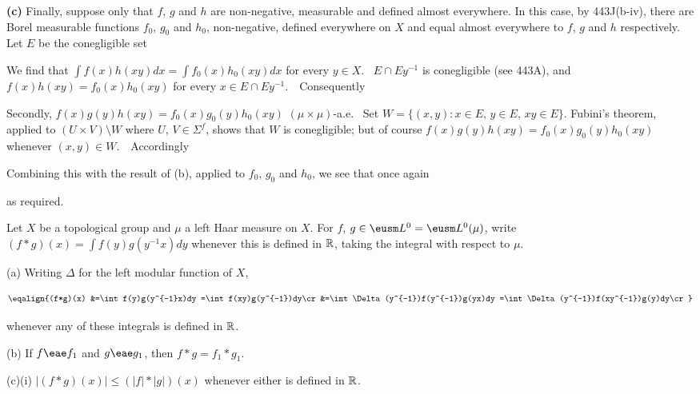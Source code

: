 {\medskip

{\bf (c)} Finally, suppose only that $f$, $g$ and $h$ are non-negative,
measurable and defined almost everywhere.   In this case, by 443J(b-iv),
there are Borel measurable functions $f_0$, $g_0$ and $h_0$,
non-negative, defined everywhere on $X$ and equal almost everywhere to
$f$, $g$ and $h$ respectively.   Let $E$ be the conegligible set


We find that $\int f(x)h(xy)dx=\int f_0(x)h_0(xy)dx$ for every $y\in X$.
\Prf\ $E\cap Ey^{-1}$ is conegligible (see 443A), and
$f(x)h(xy)=f_0(x)h_0(xy)$ for every $x\in E\cap Ey^{-1}$.\ \QeD\
Consequently


Secondly, $f(x)g(y)h(xy)=f_0(x)g_0(y)h_0(xy)\,\,(\mu\times\mu)$-a.e.
\Prf\ Set $W=\{(x,y):x\in E,\,y\in E,\,xy\in E\}$.   Fubini's theorem,
applied to $(U\times V)\setminus W$ where $U$, $V\in\Sigma^f$, shows
that $W$ is conegligible;  but of course
$f(x)g(y)h(xy)=f_0(x)g_0(y)h_0(xy)$ whenever $(x,y)\in W$.\ \QeD\
Accordingly


Combining this with the result of (b), applied to $f_0$, $g_0$ and
$h_0$, we see that once again


\noindent as required.
}%

 Let $X$ be a
topological group and $\mu$ a left Haar measure on $X$.   For $f$,
$g\in\eusm L^0=\eusm L^0(\mu)$,  write
$(f*g)(x)=\int f(y)g(y^{-1}x)dy$ whenever this is defined in
$\Bbb R$, taking the integral with respect to $\mu$.

(a) Writing $\Delta$ for the left modular function of $X$,

$$\eqalign{(f*g)(x)
&=\int f(y)g(y^{-1}x)dy
=\int f(xy)g(y^{-1})dy\cr
&=\int\Delta(y^{-1})f(y^{-1})g(yx)dy
=\int\Delta(y^{-1})f(xy^{-1})g(y)dy\cr}$$

\noindent whenever any of these integrals is defined in $\Bbb R$.

(b) If $f\eae f_1$ and $g\eae g_1$, then $f*g=f_1*g_1$.

(c)(i) $|(f*g)(x)|\le(|f|*|g|)(x)$ whenever either is defined in $\Bbb R$.

